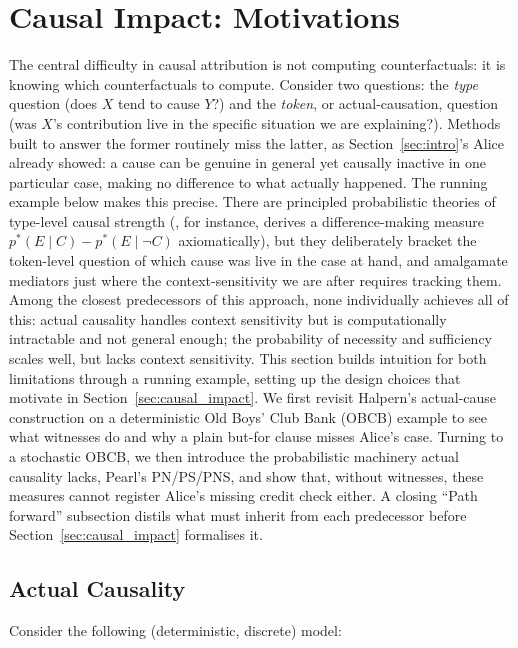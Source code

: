 \section{Causal Impact: Motivations}\label{sec:motivations}

The central difficulty in causal attribution is not computing counterfactuals: it is knowing which counterfactuals to compute. Consider two questions: the \emph{type} question (does $X$ tend to cause $Y$?) and the \emph{token}, or actual-causation, question (was $X$'s contribution live in the specific situation we are explaining?). Methods built to answer the former routinely miss the latter, as Section~\ref{sec:intro}'s Alice already showed: a cause can be genuine in general yet causally inactive in one particular case, making no difference to what actually happened. The running example below makes this precise.
There are principled probabilistic theories of type-level causal strength (\citet{sprenger2018foundations}, for instance, derives a difference-making measure $p^*(E \mid C) - p^*(E \mid \neg C)$ axiomatically), but they deliberately bracket the token-level question of which cause was live in the case at hand, and amalgamate mediators just where the context-sensitivity we are after requires tracking them.
Among the closest predecessors of this approach, none individually achieves all of this: actual causality handles context sensitivity but is computationally intractable and not general enough;
the probability of necessity and sufficiency scales well, but lacks context sensitivity.
This section builds intuition for both limitations through a running example, setting up the design choices that motivate \ourapproach in Section~\ref{sec:causal_impact}.
We first revisit Halpern's actual-cause
construction on a deterministic Old Boys' Club Bank (OBCB) example to see what witnesses do and why a plain
but-for clause misses Alice's case. Turning to a stochastic OBCB, we then introduce the
probabilistic machinery actual causality lacks, Pearl's PN/PS/PNS, and show that, without
witnesses, these measures cannot register Alice's missing credit check either. A closing
``Path forward'' subsection distils what \ourapproach must inherit
from each predecessor before Section~\ref{sec:causal_impact} formalises it.

\subsection{Actual Causality}

Consider the following (deterministic, discrete) model:

